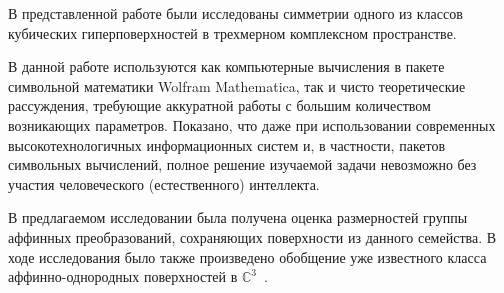 \documentclass[../main.tex]{subfiles}
\begin{document}
В представленной работе были исследованы симметрии одного из классов кубических гиперповерхностей в трехмерном комплексном пространстве.

В данной работе используются как компьютерные вычисления в пакете символьной математики {\ttfamily Wolfram Mathematica}, так и чисто теоретические рассуждения, требующие аккуратной работы с большим количеством возникающих параметров. Показано, что даже при использовании современных высокотехнологичных информационных систем и, в частности, пакетов символьных вычислений, полное решение изучаемой задачи невозможно без участия человеческого (естественного) интеллекта.

В предлагаемом исследовании была получена оценка размерностей группы аффинных преобразований, сохраняющих поверхности из данного семейства. В ходе исследования было также произведено обобщение уже известного класса аффинно-однородных поверхностей в $\mathbb{C}^3$~\cite{ALS}.
\end{document}
